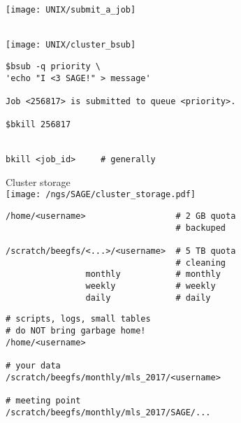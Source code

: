 \documentclass[xcolor=dvipsnames]{beamer}
\begin{document}
\begin{frame}
	\begin{center}
		\texttt{[image: UNIX/submit\_a\_job]}
	\end{center}
\end{frame}

\begin{frame}
	\begin{center}
		\Huge
		~\\
		\vspace{1cm}
		\texttt{[image: UNIX/cluster\_bsub]}
	\end{center}
\end{frame}

\begin{frame}[fragile]
\large
\begin{verbatim}
$bsub -q priority \
'echo "I <3 SAGE!" > message'

Job <256817> is submitted to queue <priority>.

$bkill 256817


bkill <job_id>     # generally
\end{verbatim}
\end{frame}

\begin{frame}
	\begin{center}
		\Huge
		Cluster storage\\
		\vspace{1cm}
		\texttt{[image: /ngs/SAGE/cluster\_storage.pdf]}
	\end{center}
\end{frame}

\begin{frame}[fragile]
\large
\begin{verbatim}
/home/<username>                  # 2 GB quota
                                  # backuped

/scratch/beegfs/<...>/<username>  # 5 TB quota
                                  # cleaning
                monthly           # monthly
                weekly            # weekly
                daily             # daily
\end{verbatim}
\end{frame}

\begin{frame}[fragile]
\large
\begin{verbatim}
# scripts, logs, small tables
# do NOT bring garbage home!
/home/<username>

# your data
/scratch/beegfs/monthly/mls_2017/<username>

# meeting point
/scratch/beegfs/monthly/mls_2017/SAGE/...
\end{verbatim}
\end{frame}
\end{document}
